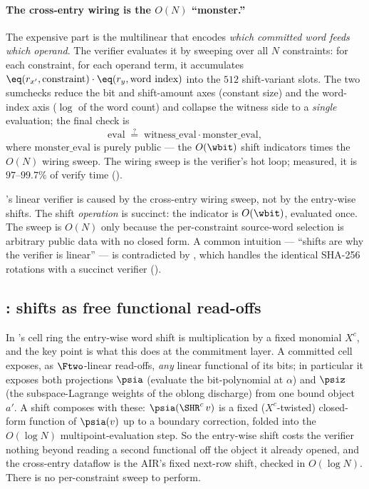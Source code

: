 \paragraph{The cross-entry wiring is the $O(N)$ ``monster.''}
The expensive part is the multilinear that encodes \emph{which committed
word feeds which operand}. The verifier evaluates it by sweeping over all
$N$ constraints: for each constraint, for each operand term, it
accumulates $\eq(r_{x'},\text{constraint})\cdot\eq(r_y,\text{word index})$
into the $512$ shift-variant slots. The two sumchecks reduce the bit and
shift-amount axes (constant size) and the word-index axis ($\log$ of the
word count) and collapse the witness side to a \emph{single} evaluation;
the final check is
\[
  \mathrm{eval} \;\stackrel{?}{=}\; \mathrm{witness\_eval}\cdot\mathrm{monster\_eval},
\]
where $\mathrm{monster\_eval}$ is purely public --- the $O(\wbit)$ shift
indicators times the $O(N)$ wiring sweep. The wiring sweep is the
verifier's hot loop; measured, it is $97$--$99.7\%$ of verify time
().

\begin{observation}
\label{obs:wiring-not-shifts}
\binius{}'s linear verifier is caused by the cross-entry wiring sweep, not
by the entry-wise shifts. The shift \emph{operation} is succinct: the
indicator is $O(\wbit)$, evaluated once. The sweep is $O(N)$ only because
the per-constraint source-word selection is arbitrary public data with no
closed form. A common intuition --- ``shifts are why the verifier is
linear'' --- is contradicted by \zinc{}, which handles the identical
SHA-256 rotations with a succinct verifier ().
\end{observation}

\subsection{\zinc{}: shifts as free functional read-offs}
\label{sec:shifts-zinc}

In \zinc{}'s cell ring the entry-wise word shift is multiplication by a
fixed monomial $X^c$, and the key point is what this does at the
commitment layer. A committed cell exposes, as $\Ftwo$-linear read-offs,
\emph{any} linear functional of its bits; in particular it exposes both
projections $\psia$ (evaluate the bit-polynomial at $\alpha$) and $\psiz$
(the subspace-Lagrange weights of the oblong discharge) from one bound
object $a'$. A shift composes with these: $\psia(\SHR^c\, v)$ is a fixed
($X^c$-twisted) closed-form function of $\psia(v)$ up to a boundary
correction, folded into the $O(\log N)$ multipoint-evaluation step. So
the entry-wise shift costs the verifier nothing beyond reading a second
functional off the object it already opened, and the cross-entry dataflow
is the AIR's fixed next-row shift, checked in $O(\log N)$. There is no
per-constraint sweep to perform.

